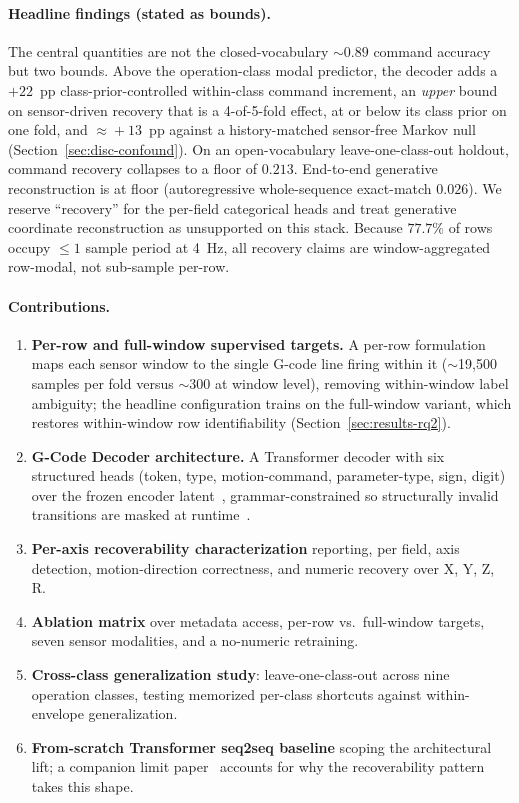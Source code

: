 \documentclass[conference]{IEEEtran}
\newcommand{\modelname}{G-Code Decoder}
\begin{document}
\paragraph{Headline findings (stated as bounds).} The central quantities are not the closed-vocabulary $\sim\!0.89$ command accuracy but two bounds. Above the operation-class modal predictor, the decoder adds a $+22$~pp class-prior-controlled within-class command increment, an \emph{upper} bound on sensor-driven recovery that is a 4-of-5-fold effect, at or below its class prior on one fold, and $\approx\!+13$~pp against a history-matched sensor-free Markov null (Section~\ref{sec:disc-confound}). On an open-vocabulary leave-one-class-out holdout, command recovery collapses to a floor of $0.213$. End-to-end generative reconstruction is at floor (autoregressive whole-sequence exact-match $0.026$). We reserve ``recovery'' for the per-field categorical heads and treat generative coordinate reconstruction as unsupported on this stack. Because $77.7\%$ of rows occupy $\le\!1$ sample period at 4~Hz, all recovery claims are window-aggregated row-modal, not sub-sample per-row.

\paragraph{Contributions.}
\begin{enumerate}[label=\textbf{(\arabic*)}, leftmargin=*]
\item \textbf{Per-row and full-window supervised targets.} A per-row formulation maps each sensor window to the single G-code line firing within it ($\sim$19{,}500 samples per fold versus $\sim$300 at window level), removing within-window label ambiguity; the headline configuration trains on the full-window variant, which restores within-window row identifiability (Section~\ref{sec:results-rq2}).
\item \textbf{\modelname{} architecture.} A Transformer decoder with six structured heads (token, type, motion-command, parameter-type, sign, digit) over the frozen encoder latent~\cite{encoder_paper}, grammar-constrained so structurally invalid transitions are masked at runtime~\cite{outlines,xgrammar}.
\item \textbf{Per-axis recoverability characterization} reporting, per field, axis detection, motion-direction correctness, and numeric recovery over X, Y, Z, R.
\item \textbf{Ablation matrix} over metadata access, per-row vs.\ full-window targets, seven sensor modalities, and a no-numeric retraining.
\item \textbf{Cross-class generalization study}: leave-one-class-out across nine operation classes, testing memorized per-class shortcuts against within-envelope generalization.
\item \textbf{From-scratch Transformer seq2seq baseline} scoping the architectural lift; a companion limit paper~\cite{paperB_entropy} accounts for why the recoverability pattern takes this shape.
\end{enumerate}
\end{document}
